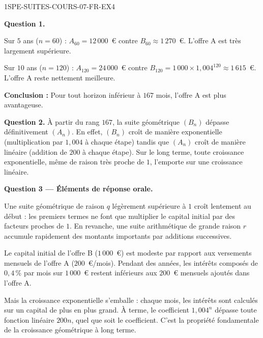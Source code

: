 \begin{corrige}{1SPE-SUITES-COURS-07-FR-EX4}

\textbf{Question 1.}

Sur $5$ ans ($n = 60$) : $A_{60} = 12\,000$~€ contre $B_{60} \approx 1\,270$~€. L'offre A est très largement supérieure.

Sur $10$ ans ($n = 120$) : $A_{120} = 24\,000$~€ contre $B_{120} = 1\,000 \times 1{,}004^{120} \approx 1\,615$~€. L'offre A reste nettement meilleure.


\textbf{Conclusion :} Pour tout horizon inférieur à $167$ mois, l'offre A est plus avantageuse.

\textbf{Question 2.} À partir du rang $167$, la suite géométrique $(B_n)$ dépasse définitivement $(A_n)$. En effet, $(B_n)$ croît de manière exponentielle (multiplication par $1{,}004$ à chaque étape) tandis que $(A_n)$ croît de manière linéaire (addition de $200$ à chaque étape). Sur le long terme, toute croissance exponentielle, même de raison très proche de $1$, l'emporte sur une croissance linéaire.

\textbf{Question 3 — Éléments de réponse orale.}

Une suite géométrique de raison $q$ légèrement supérieure à $1$ croît lentement au début : les premiers termes ne font que multiplier le capital initial par des facteurs proches de $1$. En revanche, une suite arithmétique de grande raison $r$ accumule rapidement des montants importants par additions successives.

Le capital initial de l'offre B ($1\,000$~€) est modeste par rapport aux versements mensuels de l'offre A ($200$~€/mois). Pendant des années, les intérêts composés de $0{,}4\,\%$ par mois sur $1\,000$~€ restent inférieurs aux $200$~€ mensuels ajoutés dans l'offre A.

Mais la croissance exponentielle s'emballe : chaque mois, les intérêts sont calculés sur un capital de plus en plus grand. À terme, le coefficient $1{,}004^n$ dépasse toute fonction linéaire $200n$, quel que soit le coefficient. C'est la propriété fondamentale de la croissance géométrique à long terme.

\end{corrige}
